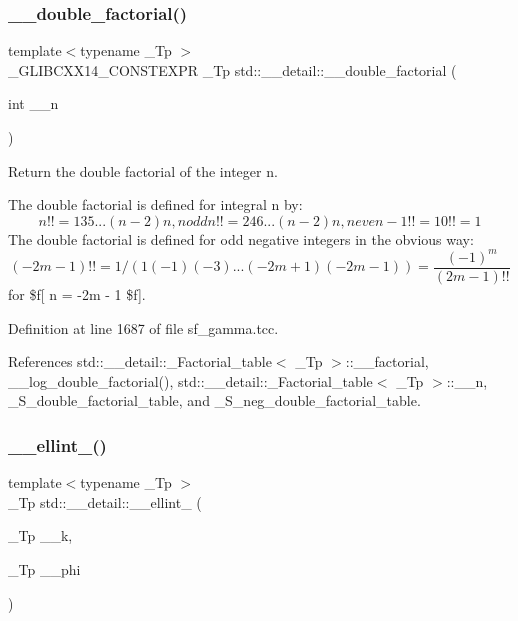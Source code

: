 \mbox{\label{namespacestd_1_1____detail_a06b0d9786afff0919c96f61d5f760c5f}} 
\subsubsection{\texorpdfstring{\+\_\+\+\_\+double\+\_\+factorial()}{\_\_double\_factorial()}}
{\footnotesize\ttfamily template$<$typename \+\_\+\+Tp $>$ \\
\+\_\+\+G\+L\+I\+B\+C\+X\+X14\+\_\+\+C\+O\+N\+S\+T\+E\+X\+PR \+\_\+\+Tp std\+::\+\_\+\+\_\+detail\+::\+\_\+\+\_\+double\+\_\+factorial (\begin{DoxyParamCaption}\item[{int}]{\+\_\+\+\_\+n }\end{DoxyParamCaption})}



Return the double factorial of the integer n. 

The double factorial is defined for integral n by\+: \[ n!! = 1 3 5 ... (n-2) n, n odd n!! = 2 4 6 ... (n-2) n, n even -1!! = 1 0!! = 1 \] The double factorial is defined for odd negative integers in the obvious way\+: \[ (-2m - 1)!! = 1 / (1 (-1) (-3) ... (-2m + 1) (-2m - 1)) = \frac{(-1)^m}{(2m-1)!!} \] for \$f\mbox{[} n = -\/2m -\/ 1 \$f\mbox{]}. 

Definition at line 1687 of file sf\+\_\+gamma.\+tcc.



References std\+::\+\_\+\+\_\+detail\+::\+\_\+\+Factorial\+\_\+table$<$ \+\_\+\+Tp $>$\+::\+\_\+\+\_\+factorial, \+\_\+\+\_\+log\+\_\+double\+\_\+factorial(), std\+::\+\_\+\+\_\+detail\+::\+\_\+\+Factorial\+\_\+table$<$ \+\_\+\+Tp $>$\+::\+\_\+\+\_\+n, \+\_\+\+S\+\_\+double\+\_\+factorial\+\_\+table, and \+\_\+\+S\+\_\+neg\+\_\+double\+\_\+factorial\+\_\+table.

\mbox{\label{namespacestd_1_1____detail_aa349fe5bcf36d29cfacf6cd3e8aa65b0}} 
\subsubsection{\texorpdfstring{\+\_\+\+\_\+ellint\+\_()}{\_\_ellint\_1()}}
{\footnotesize\ttfamily template$<$typename \+\_\+\+Tp $>$ \\
\+\_\+\+Tp std\+::\+\_\+\+\_\+detail\+::\+\_\+\+\_\+ellint\+\_ (\begin{DoxyParamCaption}\item[{\+\_\+\+Tp}]{\+\_\+\+\_\+k,  }\item[{\+\_\+\+Tp}]{\+\_\+\+\_\+phi }\end{DoxyParamCaption})}



